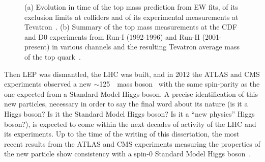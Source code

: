\begin{figure}[hbtp]
\begin{center}
\caption{(a) Evolution in time of the top mass prediction from
EW fits, of its exclusion limits at colliders and of its
experimental measurements at Tevatron~\cite{Galtieri:2011yd}.
(b) Summary of the top mass measurements at the CDF and D0 experiments
from Run-I (1992-1996) and Run-II (2001-present) 
in various channels and the resulting Tevatron average
 mass of the top quark~\cite{CDF:2013jga}.}
\end{center}
\end{figure}




Then LEP was dismantled, the LHC was built, and in 2012 
the ATLAS and CMS experiments
observed a new $\sim$125~\gev\ mass boson~\cite{2012gk,Chatrchyan201230}
with the same spin-parity as the one expected from a Standard Model
Higgs boson. A precise identification of this new particles, necessary
in order to say the final word about its nature (is it a Higgs boson?
Is it the Standard Model Higgs boson? Is it a ``new physics'' Higgs boson?),
is expected to come within the next decades of activity of the LHC and its
experiments. Up to the time of the writing of this dissertation, the most
recent results from the ATLAS and CMS experiments measuring the
properties of the new particle show consistency with a spin-0 Standard
Model Higgs boson~\cite{Aad:2013xqa,CMShiggsspin}.

